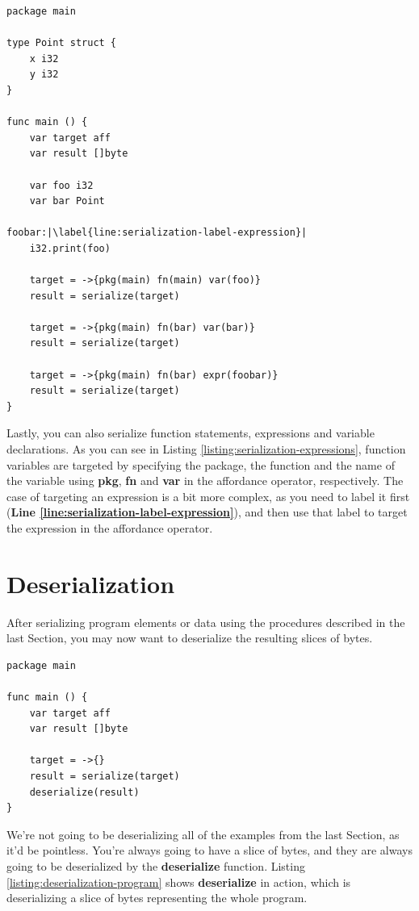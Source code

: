 \documentclass[11pt,fleqn,openany]{book} %
\begin{document}
\begin{lstlisting}[caption={Serialization of Expressions},captionpos=b,label={listing:serialization-expressions}]
package main

type Point struct {
    x i32
    y i32
}

func main () {
    var target aff
    var result []byte
    
    var foo i32
    var bar Point
    
foobar:|\label{line:serialization-label-expression}|
    i32.print(foo)

    target = ->{pkg(main) fn(main) var(foo)}
    result = serialize(target)
    
    target = ->{pkg(main) fn(bar) var(bar)}
    result = serialize(target)
    
    target = ->{pkg(main) fn(bar) expr(foobar)}
    result = serialize(target)
}
\end{lstlisting}

Lastly, you can also serialize function statements, expressions and variable declarations. As you can see in Listing \ref{listing:serialization-expressions}, function variables are targeted by specifying the package, the function and the name of the variable using \textbf{pkg}, \textbf{fn} and \textbf{var} in the affordance operator, respectively. The case of targeting an expression is a bit more complex, as you need to label it first (\textbf{Line \ref{line:serialization-label-expression}}), and then use that label to target the expression in the affordance operator.

\section{Deserialization}
\label{section:deserialization}

After serializing program elements or data using the procedures described in the last Section, you may now want to deserialize the resulting slices of bytes.

\begin{lstlisting}[caption={Deserialization of a Program},captionpos=b,label={listing:deserialization-program}]
package main

func main () {
    var target aff
    var result []byte
    
    target = ->{}
    result = serialize(target)
    deserialize(result)
}
\end{lstlisting}

We're not going to be deserializing all of the examples from the last Section, as it'd be pointless. You're always going to have a slice of bytes, and they are always going to be deserialized by the \textbf{deserialize} function. Listing \ref{listing:deserialization-program} shows \textbf{deserialize} in action, which is deserializing a slice of bytes representing the whole program.
\end{document}
